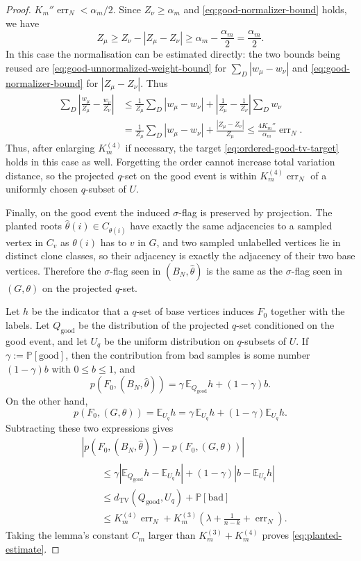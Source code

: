 \documentclass[11pt]{article}
\theoremstyle{definition}
\newcommand{\E}{\mathbb{E}}
\newcommand{\Prob}{\mathbb{P}}
\begin{document}
\begin{proof}
$K_m''\operatorname{err}_N<\alpha_m/2$.  Since $Z_\nu\ge\alpha_m$ and
\eqref{eq:good-normalizer-bound} holds, we have
\[
  Z_\mu
  \ge
  Z_\nu-|Z_\mu-Z_\nu|
  \ge
  \alpha_m-\frac{\alpha_m}{2}
  =
  \frac{\alpha_m}{2}.
\]
In this case the normalisation can be estimated directly:
the two bounds being reused are
\eqref{eq:good-unnormalized-weight-bound} for $\sum_D|w_\mu-w_\nu|$ and
\eqref{eq:good-normalizer-bound} for $|Z_\mu-Z_\nu|$.  Thus
\[
\begin{aligned}
  \sum_D\left|\frac{w_\mu}{Z_\mu}-\frac{w_\nu}{Z_\nu}\right|
  &\le
  \frac1{Z_\mu}\sum_D|w_\mu-w_\nu|
  +
  \left|\frac1{Z_\mu}-\frac1{Z_\nu}\right|\sum_D w_\nu  \\
  &=
  \frac1{Z_\mu}\sum_D|w_\mu-w_\nu|
  +
  \frac{|Z_\mu-Z_\nu|}{Z_\mu}
  \le
  \frac{4K_m''}{\alpha_m}\operatorname{err}_N .
\end{aligned}
\]
Thus, after enlarging $K_m^{(4)}$ if necessary, the target
\eqref{eq:ordered-good-tv-target} holds in this case as well.
Forgetting the order cannot increase total variation distance, so the projected
$q$-set on the good event is within $K_m^{(4)}\operatorname{err}_N$ of a
uniformly chosen $q$-subset of $U$.

Finally, on the good event the induced $\sigma$-flag is preserved by projection.
The planted roots $\widehat\theta(i)\in C_{\theta(i)}$ have exactly the same
adjacencies to a sampled vertex in $C_v$ as $\theta(i)$ has to $v$ in $G$, and
two sampled unlabelled vertices lie in distinct clone classes, so their adjacency
is exactly the adjacency of their two base vertices.  Therefore the $\sigma$-flag
seen in $(B_N,\widehat\theta)$ is the same as the $\sigma$-flag seen in
$(G,\theta)$ on the projected $q$-set.

Let $h$ be the indicator that a $q$-set of base vertices induces $F_0$ together
with the labels.  Let $Q_{\mathrm{good}}$ be the distribution of the projected
$q$-set conditioned on the good event, and let $U_q$ be the uniform distribution
on $q$-subsets of $U$.  If $\gamma:=\Prob[\text{good}]$, then the contribution
from bad samples is some number $(1-\gamma)b$ with $0\le b\le1$, and
\[
  p(F_0,(B_N,\widehat\theta))
  =
  \gamma\,\E_{Q_{\mathrm{good}}}h+(1-\gamma)b .
\]
On the other hand,
\[
  p(F_0,(G,\theta))
  =
  \E_{U_q}h
  =
  \gamma\,\E_{U_q}h+(1-\gamma)\E_{U_q}h .
\]
Subtracting these two expressions gives
\[
\begin{aligned}
&\left|p(F_0,(B_N,\widehat\theta))-p(F_0,(G,\theta))\right| \\
&\qquad\le
  \gamma\left|\E_{Q_{\mathrm{good}}}h-\E_{U_q}h\right|
  +(1-\gamma)\left|b-\E_{U_q}h\right| \\
&\qquad\le
  d_{\mathrm{TV}}(Q_{\mathrm{good}},U_q)+\Prob[\text{bad}]  \\
&\qquad\le
  K_m^{(4)}\operatorname{err}_N
  +
  K_m^{(3)}\left(\lambda+\frac1{n-k}+\operatorname{err}_N\right).
\end{aligned}
\]
Taking the lemma's constant $C_m$ larger than $K_m^{(3)}+K_m^{(4)}$ proves
\eqref{eq:planted-estimate}.
\end{proof}
\end{document}
